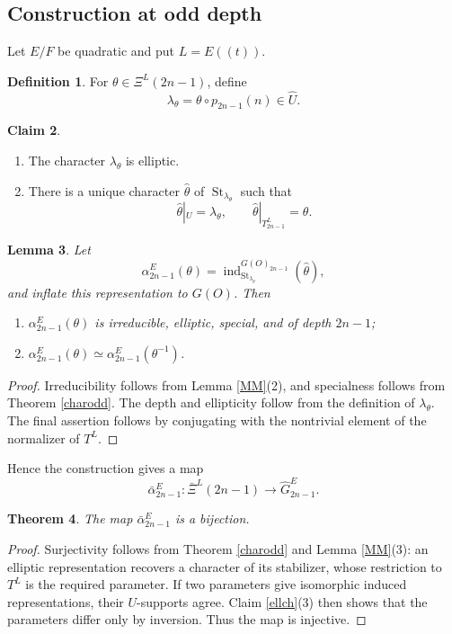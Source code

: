\documentclass[11pt,a4paper,twoside]{amsart}
\newtheorem{theorem}{Theorem}[section]
\newtheorem{lemma}[theorem]{Lemma}
\theoremstyle{definition}
\newtheorem{definition}[theorem]{Definition}
\newtheorem{claim}[theorem]{Claim}
\theoremstyle{remark}
\newcommand{\bl}{\lambda}
\newcommand{\ind}{\operatorname{ind}}
\newcommand{\St}{\operatorname{St}}
\begin{document}
\subsection{Construction at odd depth}
Let $E/F$ be quadratic and put $L=E((t))$.
\begin{definition}
For $\theta\in\Xi^L(2n-1)$, define
$$
\bl_\theta=\theta\circ p_{2n-1}(n)\in\widehat U.
$$
\end{definition}
\begin{claim}\label{oo}
\begin{enumerate}
\item The character $\bl_\theta$ is elliptic.
\item There is a unique character $\widehat\theta$ of $\St_{\bl_\theta}$ such that
$$
\widehat\theta|_U=\bl_\theta,
\qquad
\widehat\theta|_{T^L_{2n-1}}=\theta.
$$
\end{enumerate}
\end{claim}
\begin{lemma}
Let
$$
\alpha_{2n-1}^E(\theta)=\ind_{\St_{\bl_\theta}}^{G(O)_{2n-1}}(\widehat\theta),
$$
and inflate this representation to $G(O)$. Then
\begin{enumerate}
\item $\alpha_{2n-1}^E(\theta)$ is irreducible, elliptic, special, and of depth $2n-1$;
\item $\alpha_{2n-1}^E(\theta)\simeq\alpha_{2n-1}^E(\theta^{-1})$.
\end{enumerate}
\end{lemma}
\begin{proof}
Irreducibility follows from Lemma \ref{MM}(2), and specialness follows from Theorem \ref{charodd}. The depth and ellipticity follow from the definition of $\bl_\theta$. The final assertion follows by conjugating with the nontrivial element of the normalizer of $T^L$.
\end{proof}
Hence the construction gives a map
$$
\bar\alpha_{2n-1}^E:\bar\Xi^L(2n-1)\longrightarrow\widehat G_{2n-1}^E.
$$
\begin{theorem}\label{od}
The map $\bar\alpha_{2n-1}^E$ is a bijection.
\end{theorem}
\begin{proof}
Surjectivity follows from Theorem \ref{charodd} and Lemma \ref{MM}(3): an elliptic representation recovers a character of its stabilizer, whose restriction to $T^L$ is the required parameter. If two parameters give isomorphic induced representations, their $U$-supports agree. Claim \ref{ellch}(3) then shows that the parameters differ only by inversion. Thus the map is injective.
\end{proof}
\end{document}
